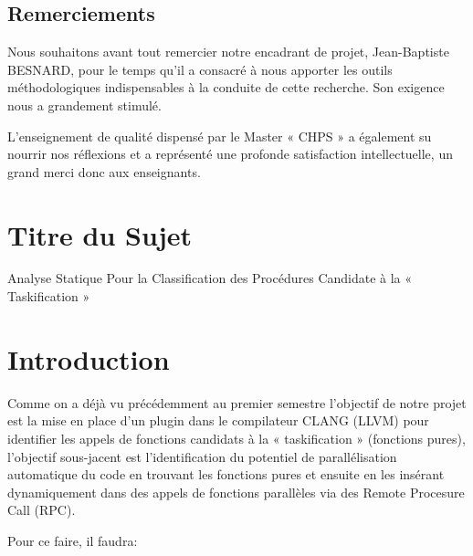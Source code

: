 \documentclass[12pt,titlepage]{article}
\begin{document}
\begin{center}
	\begin{minipage}{13cm}


\section*{ \huge \bfseries \center Remerciements}
Nous souhaitons avant tout remercier notre encadrant de projet, Jean-Baptiste BESNARD, pour le temps qu’il a consacré à nous apporter les outils méthodologiques indispensables à la conduite de cette recherche. Son exigence nous a grandement stimulé.

L’enseignement de qualité dispensé par le Master « CHPS » a également su nourrir nos réflexions et a représenté une profonde satisfaction intellectuelle, un grand merci donc aux enseignants.

	\end{minipage}
\end{center}





\pagebreak

\renewcommand*\contentsname{Sommaire}
\tableofcontents

\pagebreak

\section{Titre du Sujet}

Analyse Statique Pour la Classification des Procédures Candidate à la « Taskification »

\section{Introduction}

Comme on a déjà vu précédemment au premier semestre l'objectif de notre projet est la mise en place d’un plugin dans le compilateur CLANG (LLVM) pour identifier les appels de fonctions candidats à la « taskification » (fonctions pures), l'objectif sous-jacent est l'identification du potentiel de parallélisation automatique du code en trouvant les fonctions pures et ensuite en les insérant dynamiquement dans des appels de fonctions parallèles via des Remote Procesure Call (RPC).

Pour ce faire, il faudra: 
\end{document}
